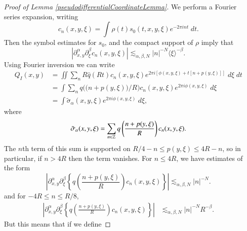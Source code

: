 \begin{proof} [Proof of Lemma \ref{pseudodifferentialCoordinateLemma}]
    We perform a Fourier series expansion, writing
    \begin{equation} c_n(x,y,\xi) = \int \rho(t) s_0(t,x,y,\xi) e^{-2 \pi i n t}\; dt. \end{equation}
    Then the symbol estimates for $s_0$, and the compact support of $\rho$ imply that
    \begin{equation} |\partial_{x,y}^\alpha \partial_\xi^\beta c_n(x,y,\xi)| \lesssim_{\alpha,\beta,N} |n|^{-N} \langle \xi \rangle^{-\beta}. \end{equation}
    Using Fourier inversion we can write
    \begin{equation}
    \begin{split}
        Q_I(x,y) &= \iint \sum\nolimits_n R \widehat{q}(Rt) c_n(x,y,\xi) e^{2 \pi i [ \phi(x,y,\xi) + t [ n + p(y,\xi) ] ]}\; d\xi\; dt\\
        &= \int \sum\nolimits_n q \Big( \big( n + p(y,\xi) \big) / R \Big) c_n(x,y,\xi) e^{2 \pi i \phi(x,y,\xi)}\; d\xi\\
        &= \int \tilde{\sigma}_\alpha(x,y,\xi) e^{2 \pi i \phi(x,y,\xi)}\; d\xi, 
    \end{split}
    \end{equation}
    where
    \begin{equation} \tilde{\sigma}_\alpha(x,y,\xi) = \sum_{n \in \operatorname{\mathbb{Z}}} q \left( \frac{n + p(y,\xi)}{R} \right) c_n(x,y,\xi). \end{equation}
    The $n$th term of this sum is supported on $R/4 - n \leq p(y,\xi) \leq 4R - n$, so in particular, if $n > 4R$ then the term vanishes. For $n \leq 4R$, we have estimates of the form
    \begin{equation} \left| \partial_{x,y}^\alpha \partial_\xi^\beta \left\{ q \left( \frac{n + p(y,\xi)}{R} \right) c_n(x,y,\xi) \right\} \right| \lesssim_{\alpha,\beta,N} |n|^{-N}. \end{equation}
    and for $-4R \leq n \leq R/8$,
    \begin{equation}
    \begin{split}
        \left| \partial_{x,y}^\alpha \partial_\xi^\beta \left\{ q \left( \frac{n + p(y,\xi)}{R} \right) c_n(x,y,\xi) \right\} \right| &\lesssim_{\alpha,\beta,N} |n|^{-N} R^{-\beta}.
    \end{split}
    \end{equation}
    But this means that if we define

\end{proof}
